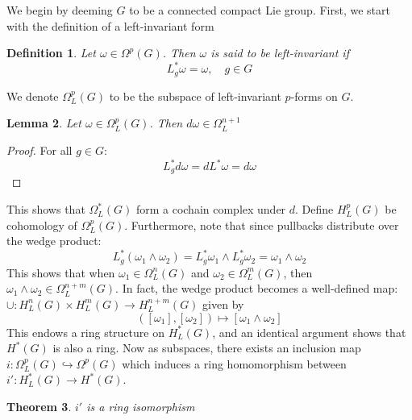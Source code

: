 \documentclass[12pt]{amsart}
\newtheorem{theorem}{Theorem}[section]
\newtheorem{lemma}[theorem]{Lemma}
\newtheorem{definition}[theorem]{Definition}
\numberwithin{equation}{section}
\begin{document}
We begin by deeming $G$ to be a connected compact Lie group. First, we start with the definition of a left-invariant form
%
\begin{definition}
  Let $\omega \in \Omega^p(G)$. Then $\omega$ is said to be \emph{left-invariant} if
  \begin{equation}
    L_g^*\omega = \omega, \quad g \in G
  \end{equation}
\end{definition}
%
\noindent We denote $\Omega_L^p(G)$ to be the subspace of left-invariant $p$-forms on $G$.
%
\begin{lemma}
  Let $\omega \in \Omega_L^p(G)$. Then $d\omega \in \Omega_L^{n+1}$
\end{lemma}
\begin{proof}
  For all $g \in G$:
  $$L^*_gd\omega = dL^*\omega = d\omega$$
\end{proof}
\noindent This shows that $\Omega_L^{*}(G)$ form a cochain complex under $d$. Define $H^p_L(G)$ be cohomology of $\Omega^p_L(G)$. Furthermore, note that since pullbacks distribute over the wedge product:
$$ L^*_g(\omega_1 \wedge \omega_2) = L^*_g\omega_1 \wedge L^*_g\omega_2  = \omega_1 \wedge \omega_2$$
This shows that when $\omega_1 \in \Omega_L^n(G)$ and $\omega_2 \in \Omega_L^m(G)$, then $\omega_1 \wedge \omega_2 \in \Omega_L^{n+m}(G)$. In fact, the wedge product becomes a well-defined map: $\cup : H^n_L(G) \times H^{m}_L(G) \rightarrow H^{n+m}_L(G)$ given by $$([\omega_1] ,[\omega_2]) \mapsto [\omega_1 \wedge \omega_2]$$
This endows a ring structure on $H^{*}_L(G)$, and an identical argument shows that $H^*(G)$ is also a ring. Now as subspaces, there exists an inclusion map $i: \Omega_L^p(G) \hookrightarrow \Omega^p(G)$ which induces a ring homomorphism between $i': H^*_L(G) \rightarrow H^*(G)$.
%
\begin{theorem} \label{leftrep}
$i'$ is a ring isomorphism
\end{theorem}
%
\end{document}
